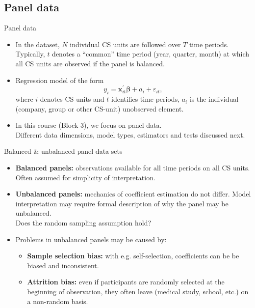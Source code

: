 \documentclass[usenames,dvipsnames]{beamer}
\begin{document}
\subsection*{Panel data}
\begin{frame}{Panel data}
\begin{itemize}
\item In the dataset, $N$ individual CS units are followed over $T$ time periods. Typically, $t$ denotes a ``common'' time period (year, quarter, month) at which all CS units are observed if the panel is balanced.
\medskip
\item Regression model of the form $$y_i = \bm{x}_{it}^{\prime}\bm{\beta} + a_i + \varepsilon_{it},$$ where $i$ denotes CS units and $t$ identifies time periods, $a_i$ is the individual (company, group or other CS-unit) unobserved element. 
\medskip
\item In this course (Block 3), we focus on panel data.\\ \medskip Different data dimensions, model types, estimators and tests discussed next.
\end{itemize}
\end{frame}
\begin{frame}{Balanced \& unbalanced panel data sets}
\begin{itemize}
\bigskip
\item \textbf{Balanced panels:} observations available for all time periods on all CS units. Often assumed for simplicity of interpretation.
\bigskip
\item \textbf{Unbalanced panels:} mechanics of coefficient estimation do not differ. Model interpretation may require formal description of why the panel may be unbalanced.\\Does the random sampling assumption hold? 
\bigskip
\item Problems in unbalanced panels may be caused by: 
\medskip
\begin{itemize}
    \item \textbf{Sample selection bias:} with e.g. self-selection, coefficients can be be biased and inconsistent.
    \medskip
    \item \textbf{Attrition bias:} even if participants are randomly selected  at the beginning of observation, they often leave (medical study, school, etc.) on a non-random basis.   
\end{itemize}
\end{itemize}
\end{frame}
\end{document}
